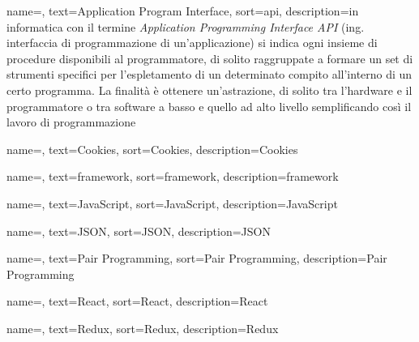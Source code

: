 
\renewcommand{\acronymname}{Acronimi e abbreviazioni}




{
    name=,
    text=Application Program Interface,
    sort=api,
    description={in informatica con il termine \emph{Application Programming Interface API} (ing. interfaccia di programmazione di un'applicazione) si indica ogni insieme di procedure disponibili al programmatore, di solito raggruppate a formare un set di strumenti specifici per l'espletamento di un determinato compito all'interno di un certo programma. La finalità è ottenere un'astrazione, di solito tra l'hardware e il programmatore o tra software a basso e quello ad alto livello semplificando così il lavoro di programmazione}
}

{
    name=,
    text=Cookies,
    sort=Cookies,
    description={Cookies}
}

{
    name=,
    text=framework,
    sort=framework,
    description={framework}
}

{
    name=,
    text=JavaScript,
    sort=JavaScript,
    description={JavaScript}
}

{
    name=,
    text=JSON,
    sort=JSON,
    description={JSON}
}

{
    name=,
    text=Pair Programming,
    sort=Pair Programming,
    description={Pair Programming}
}

{
    name=,
    text=React,
    sort=React,
    description={React}
}

{
    name=,
    text=Redux,
    sort=Redux,
    description={Redux}
}

